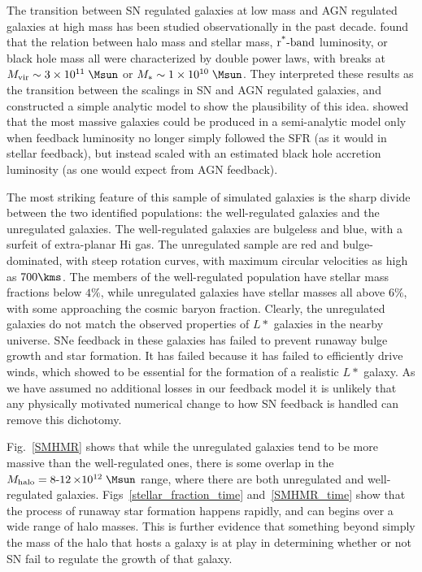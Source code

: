 The transition between SN regulated galaxies at low mass and AGN regulated galaxies
at high mass has been studied observationally in the past decade.  \citet{Shankar2006}
found that the relation between halo mass and stellar mass,
$\operatorname{r^*-\rm{band}}$
luminosity, or black hole mass all were characterized by double power laws, with
breaks at $M_{\rm vir}\sim3\times10^{11}\;\Msun$ or $M_*\sim1\times10^{10}\;\Msun$.
They interpreted these results as the transition between the scalings in SN and
AGN regulated galaxies, and constructed a simple analytic model to show the
plausibility of this idea.  \citet{Croton2006} showed that the most massive
galaxies could be produced in a semi-analytic model only when feedback
luminosity no longer simply followed the SFR (as it would in
stellar feedback), but instead scaled with an estimated black hole accretion
luminosity (as one would expect from AGN feedback).  

The most striking feature of this sample of simulated galaxies is the sharp
divide between the two identified populations: the well-regulated galaxies and
the unregulated galaxies.  The well-regulated galaxies are bulgeless and blue,
with a surfeit of extra-planar {\sc Hi} gas.  The unregulated sample are red and
bulge-dominated, with steep rotation curves, with maximum circular velocities as
high as $700\kms$.  The members of the well-regulated population have stellar
mass fractions below $4\%$, while unregulated galaxies have stellar masses all
above $6\%$, with some approaching the cosmic baryon fraction.  Clearly, the
unregulated galaxies do not match the observed properties of $L*$ galaxies in
the nearby universe.  SNe feedback in these galaxies has failed to
prevent runaway bulge growth and star formation.  It has failed because it has
failed to efficiently drive winds, which \citet{Keller2015} showed to be
essential for the formation of a realistic $L*$ galaxy.    As we have assumed no
additional losses in our feedback model it is unlikely that any physically
motivated numerical change to how SN feedback is handled can remove this
dichotomy.

Fig.~\ref{SMHMR} shows that while the unregulated galaxies tend to be more
massive than the well-regulated ones, there is some overlap in the $M_{\rm
halo}=\operatorname{8-12}\times10^{12}\;\Msun$ range, where there are both
unregulated and well-regulated galaxies.  Figs~\ref{stellar_fraction_time}
and~\ref{SMHMR_time} show that the process of runaway star formation happens
rapidly, and can begins over a wide range of halo masses.  This is further
evidence that something beyond simply the mass of the halo that hosts a galaxy
is at play in determining whether or not SN fail to regulate the growth of that
galaxy.

